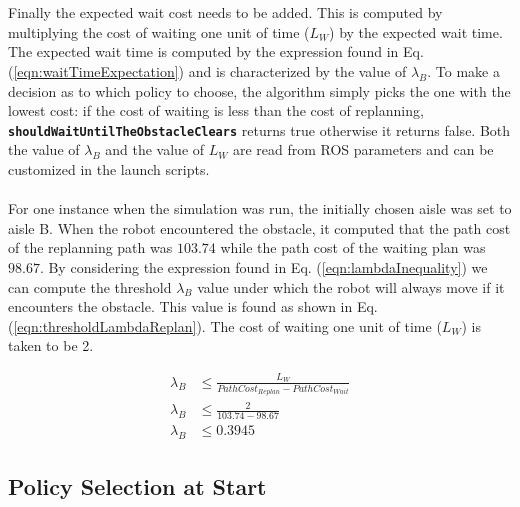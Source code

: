 \documentclass[a4paper,12pt]{article}
\begin{document}
		\\
		\\
		Finally the expected wait cost needs to be added. This is computed by multiplying the cost of waiting one unit of time ($L_W$) by the expected wait time. The expected wait time is computed by the expression found in Eq. (\ref{eqn:waitTimeExpectation}) and is characterized by the value of $\lambda_B$. To make a decision as to which policy to choose, the algorithm simply picks the one with the lowest cost: if the cost of waiting is less than the cost of replanning, \textbf{\texttt{shouldWaitUntilTheObstacleClears}} returns true otherwise it returns false. Both the value of $\lambda_B$ and the value of $L_W$ are read from ROS parameters and can be customized in the launch scripts.
		\\
		\\
		For one instance when the simulation was run, the initially chosen aisle was set to aisle B. When the robot encountered the obstacle, it computed that the path cost of the replanning path was $103.74$ while the path cost of the waiting plan was $98.67$. By considering the expression found in Eq. (\ref{eqn:lambdaInequality}) we can compute the threshold $\lambda_B$ value under which the robot will always move if it encounters the obstacle. This value is found as shown in Eq. (\ref{eqn:thresholdLambdaReplan}). The cost of waiting one unit of time ($L_W$) is taken to be 2.
		
		\begin{equation}
		\begin{split}
			\lambda_B &\leq \frac{L_W}{PathCost_{Replan} - PathCost_{Wait}} \\
			\lambda_B &\leq \frac{2}{103.74 - 98.67} \\
			\lambda_B &\leq 0.3945
			\end{split}
		\label{eqn:thresholdLambdaReplan}
		\end{equation}
	
	\subsection{Policy Selection at Start}
	\label{sec:policySelectionAtStartROS}
	
\end{document}
